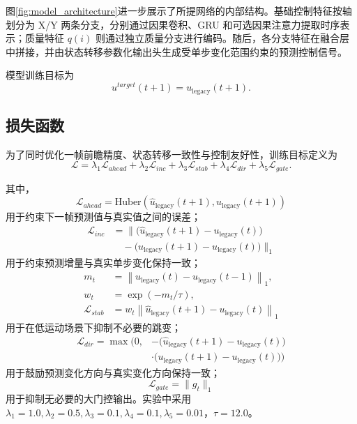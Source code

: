 \documentclass[journal]{IEEEtran}
\begin{document}
图\ref{fig:model_architecture}进一步展示了所提网络的内部结构。基础控制特征按轴划分为 X/Y 两条分支，分别通过因果卷积、GRU 和可选因果注意力提取时序表示；质量特征 $q(i)$ 则通过独立质量分支进行编码。随后，各分支特征在融合层中拼接，并由状态转移参数化输出头生成受单步变化范围约束的预测控制信号。

模型训练目标为
\begin{equation}
u^{target}(t+1)=u_{\mathrm{legacy}}(t+1).
\end{equation}

\subsection{损失函数}
为了同时优化一帧前瞻精度、状态转移一致性与控制友好性，训练目标定义为
\begin{equation}
\mathcal{L}=\lambda_1\mathcal{L}_{ahead}+\lambda_2\mathcal{L}_{inc}+\lambda_3\mathcal{L}_{stab}+\lambda_4\mathcal{L}_{dir}+\lambda_5\mathcal{L}_{gate}.
\end{equation}

其中，
\begin{equation}
\mathcal{L}_{ahead}=\mathrm{Huber}\!\left(\hat{u}_{\mathrm{legacy}}(t+1),u_{\mathrm{legacy}}(t+1)\right)
\end{equation}
用于约束下一帧预测值与真实值之间的误差；
\begin{equation}
\begin{aligned}
\mathcal{L}_{inc} &= \Big\|\big(\hat{u}_{\mathrm{legacy}}(t+1)-u_{\mathrm{legacy}}(t)\big) \\
&\quad - \big(u_{\mathrm{legacy}}(t+1)-u_{\mathrm{legacy}}(t)\big)\Big\|_1
\end{aligned}
\end{equation}
用于约束预测增量与真实单步变化保持一致；
\begin{equation}
\begin{aligned}
m_t &= \left\|u_{\mathrm{legacy}}(t)-u_{\mathrm{legacy}}(t-1)\right\|_1,\\
w_t &= \exp(-m_t/\tau),\\
\mathcal{L}_{stab} &= w_t \left\|\hat{u}_{\mathrm{legacy}}(t+1)-u_{\mathrm{legacy}}(t)\right\|_1
\end{aligned}
\end{equation}
用于在低运动场景下抑制不必要的跳变；
\begin{equation}
\begin{aligned}
\mathcal{L}_{dir} = \max\!\Big(0,&-\big(\hat{u}_{\mathrm{legacy}}(t+1)-u_{\mathrm{legacy}}(t)\big) \\
&\cdot \big(u_{\mathrm{legacy}}(t+1)-u_{\mathrm{legacy}}(t)\big)\Big)
\end{aligned}
\end{equation}
用于鼓励预测变化方向与真实变化方向保持一致；
\begin{equation}
\mathcal{L}_{gate}=\|g_t\|_1
\end{equation}
用于抑制无必要的大门控输出。实验中采用 $\lambda_1=1.0,\lambda_2=0.5,\lambda_3=0.1,\lambda_4=0.1,\lambda_5=0.01$，$\tau=12.0$。
\end{document}
